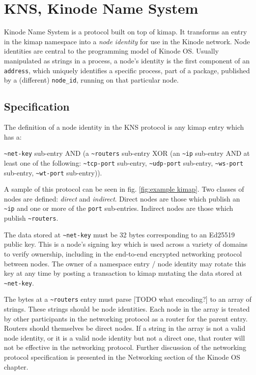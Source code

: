 \documentclass[runningheads]{llncs}
\begin{document}
%
%
%
\section{KNS, Kinode Name System}

Kinode Name System is a protocol built on top of kimap.
It transforms an entry in the kimap namespace into a \textit{node identity} for use in the Kinode network.
Node identities are central to the programming model of Kinode OS.
Usually manipulated as strings in a process, a node's identity is the first component of an \verb|address|, which uniquely identifies a specific process, part of a package, published by a (different) \verb|node_id|, running on that particular node.

\subsection{Specification}

The definition of a node identity in the KNS protocol is any kimap entry which has a:

\verb|~net-key| sub-entry AND (a \verb|~routers| sub-entry XOR (an \verb|~ip| sub-entry AND at least one of the following: \verb|~tcp-port| sub-entry, \verb|~udp-port| sub-entry, \verb|~ws-port| sub-entry, \verb|~wt-port| sub-entry)).

A sample of this protocol can be seen in fig. \ref{fig:example kimap}. Two classes of nodes are defined: \textit{direct} and \textit{indirect}. Direct nodes are those which publish an \verb|~ip| and one or more of the \verb|port| sub-entries. Indirect nodes are those which publish \verb|~routers|.

The data stored at \verb|~net-key| must be 32 bytes corresponding to an Ed25519 public key.
This is a node's signing key which is used across a variety of domains to verify ownership, including in the end-to-end encrypted networking protocol between nodes.
The owner of a namespace entry / node identity may rotate this key at any time by posting a transaction to kimap mutating the data stored at \verb|~net-key|.

The bytes at a \verb|~routers| entry must parse [TODO what encoding?] to an array of strings.
These strings should be node identities.
Each node in the array is treated by other participants in the networking protocol as a router for the parent entry.
Routers should themselves be direct nodes.
If a string in the array is not a valid node identity, or it is a valid node identity but not a direct one, that router will not be effective in the networking protocol.
Further discussion of the networking protocol specification is presented in the Networking section of the Kinode OS chapter.
\end{document}
